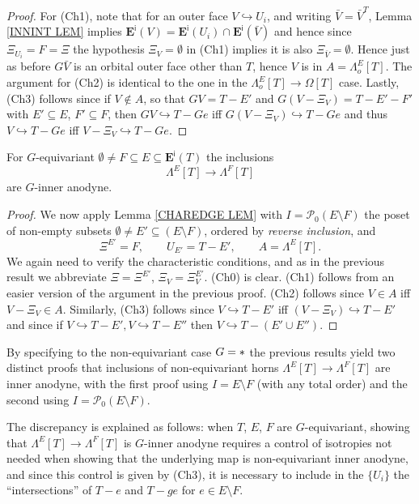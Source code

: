 \documentclass[a4paper,10pt
,draft
]{article}%
\begin{document}
\begin{proof}
For (Ch1), note that for an outer face 
$V \hookrightarrow U_i$, and writing $\bar{V} = \bar{V}^T$,
Lemma \ref{INNINT LEM} implies
$\boldsymbol{E}^{\mathsf{i}}(V) = 
\boldsymbol{E}^{\mathsf{i}}(U_i) \cap \boldsymbol{E}^{\mathsf{i}}(\bar{V})$
and hence since $\Xi_{U_i} = F = \Xi$ the 
hypothesis $\Xi_{V} = \emptyset$ in (Ch1) implies it is also
$\Xi_{\bar{V}} = \emptyset$.
Hence just as before $G\bar{V}$ is an orbital outer face other than $T$, hence $V$ is in $A=\Lambda_o^{E}[T]$.
The argument for (Ch2) is identical to the one in the
$\Lambda_o^{E}[T] \to \Omega[T]$ case.
Lastly, (Ch3) follows since	if $V \not \in A$, so that
$GV = T - E'$ and $G(V - \Xi_V) = T-E'-F'$ with
$E' \subseteq E$, $F' \subseteq F$,
then $GV \hookrightarrow T-Ge$ iff $G(V - \Xi_V) \hookrightarrow T-Ge$
and thus $V \hookrightarrow T-Ge$ iff $V - \Xi_V \hookrightarrow T-Ge$.
\end{proof}


\begin{proposition}\label{REG_HORN_PROP}
For $G$-equivariant 
$\emptyset \neq F \subseteq E \subseteq 
\boldsymbol{E}^{\mathsf{i}}(T)$
the inclusions
\begin{equation}
	\Lambda^{E}[T] \to \Lambda^{F}[T]
\end{equation}
are $G$-inner anodyne.
\end{proposition}

\begin{proof}
We now apply Lemma \ref{CHAREDGE LEM} with 
$I = \mathcal{P}_0(E\setminus F)$
the poset of non-empty subsets $\emptyset \neq E' \subseteq (E \setminus F)$, ordered by \textit{reverse inclusion}, and
\[
	\Xi^{E'} = F, \qquad
	U_{E'} = T - E', \qquad
	A=\Lambda^{E}[T].
\]
We again need to verify the characteristic conditions,
and as in the previous result we abbreviate
$\Xi = \Xi^{E'}$, $\Xi_V = \Xi^{E'}_V$.
(Ch0) is clear. (Ch1) follows from an easier version of the argument in the previous proof.
(Ch2) follows since $V \in A$ iff $V-\Xi_V \in A$.
Similarly,
(Ch3) follows since 
$V \hookrightarrow T-E'$ iff $(V-\Xi_V) \hookrightarrow T-E'$
and since if
$V \hookrightarrow T-E',V \hookrightarrow T-E''$
then 
$V \hookrightarrow T-(E' \cup E'')$.
\end{proof}


\begin{remark}\label{TWOPROOF REM}
	By specifying to the non-equivariant case $G = \**$
	the previous results yield two distinct proofs
	that inclusions of non-equivariant horns
	$\Lambda^{E}[T] \to \Lambda^{F}[T]$
	are inner anodyne,
	with the first proof using $I = E \setminus F$ (with any total order) and the second using 
	$I = \mathcal{P}_0(E \setminus F)$. 

	The discrepancy is explained as follows: 
	when $T$, $E$, $F$ are $G$-equivariant, showing that
	$\Lambda^{E}[T] \to \Lambda^{F}[T]$ 
	is $G$-inner anodyne requires a control of isotropies 
	not needed when showing that the underlying map is non-equivariant inner anodyne, and since this control is given by (Ch3), it is necessary to include in the $\{U_i\}$ the
	``intersections'' of $T-e$ and $T-ge$ for $e \in E \setminus F$. 
\end{remark}
\end{document}
